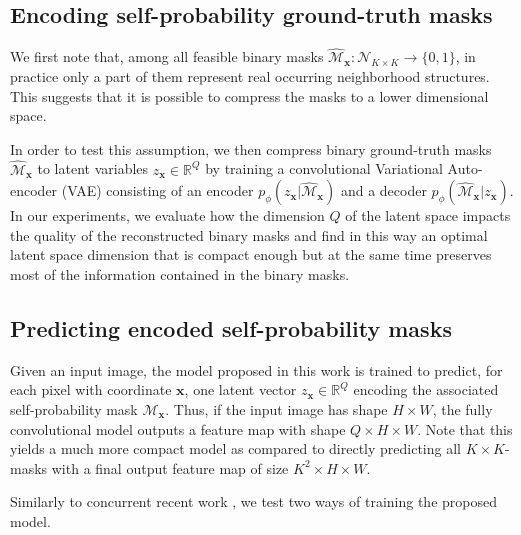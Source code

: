 \subsection{Encoding self-probability ground-truth masks}\label{sec:encoding_masks}
We first note that, among all feasible binary masks $\hat{\mathcal{M}}_{\mathbf{x}}: \mathcal{N}_{K\times K} \rightarrow \{0,1\}$, in practice only a part of them represent real occurring neighborhood structures. 
This suggests that it is possible to compress the masks to a lower dimensional space. 

In order to test this assumption, we then compress binary ground-truth masks $\hat{\mathcal{M}}_{\mathbf{x}}$ to latent variables $z_{\mathbf{x}}\in \mathbb{R}^Q$ by training a convolutional Variational Auto-encoder (VAE) \cite{kingma2013auto,rezende2014stochastic} consisting of an encoder $p_{\phi}(z_{\mathbf{x}}|\hat{\mathcal{M}}_{\mathbf{x}})$ and a decoder $p_{\phi}(\hat{\mathcal{M}}_{\mathbf{x}}|z_{\mathbf{x}})$.
In our experiments, we evaluate how the dimension $Q$ of the latent space impacts the quality of the reconstructed binary masks and find in this way an optimal latent space dimension that is compact enough but at the same time preserves most of the information contained in the binary masks.

\subsection{Predicting encoded self-probability masks} \label{sec:model_and_loss}
Given an input image, the model proposed in this work is trained to predict, for each pixel with coordinate $\mathbf{x}$, one latent vector $z_{\mathbf{x}}\in \mathbb{R}^Q$ encoding the associated self-probability mask $\mathcal{M}_{\mathbf{x}}$. Thus, if the input image has shape $H\times W$, the fully convolutional model outputs a feature map with shape $Q\times H\times W$. 
Note that this yields a much more compact model as compared to directly predicting all $K\times K$-masks with a final output feature map of size $K^2\times H\times W$.

Similarly to concurrent recent work \cite{hirsch2020patchperpix}, we test two ways of training the proposed model. \\

